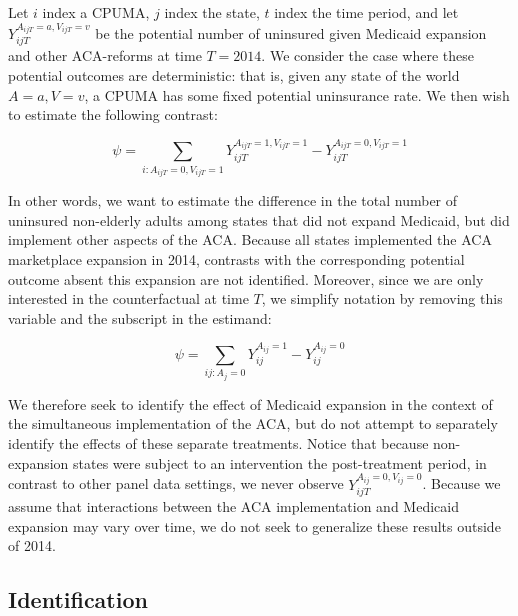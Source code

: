 \documentclass[12pt]{article}
\begin{document}
Let $i$ index a CPUMA, $j$ index the state, $t$ index the time period, and let $Y_{ijT}^{A_{ijT} = a, V_{ijT} = v}$ be the potential number of uninsured given Medicaid expansion and other ACA-reforms at time $T = 2014$. We consider the case where these potential outcomes are deterministic: that is, given any state of the world $A = a, V = v$, a CPUMA has some fixed potential uninsurance rate. We then wish to estimate the following contrast:

$$
\psi = \sum_{i: A_{ijT} = 0, V_{ijT} = 1} Y_{ijT}^{A_{ijT} = 1, V_{ijT} = 1} - Y_{ijT}^{A_{ijT} = 0, V_{ijT} = 1} 
$$

In other words, we want to estimate the difference in the total number of uninsured non-elderly adults among states that did not expand Medicaid, but did implement other aspects of the ACA. Because all states implemented the ACA marketplace expansion in 2014, contrasts with the corresponding potential outcome absent this expansion are not identified. Moreover, since we are only interested in the counterfactual at time $T$, we simplify notation by removing this variable and the subscript in the estimand:

$$
\psi = \sum_{ij: A_j = 0} Y_{ij}^{A_{ij} = 1} - Y_{ij}^{A_{ij} = 0}
$$

We therefore seek to identify the effect of Medicaid expansion in the context of the simultaneous implementation of the ACA, but do not attempt to separately identify the effects of these separate treatments. Notice that because non-expansion states were subject to an intervention the post-treatment period, in contrast to other panel data settings, we never observe $Y_{ijT}^{A_{ij} = 0, V_{ij} = 0}$. Because we assume that interactions between the ACA implementation and Medicaid expansion may vary over time, we do not seek to generalize these results outside of 2014. 

\subsection{Identification}
\end{document}
